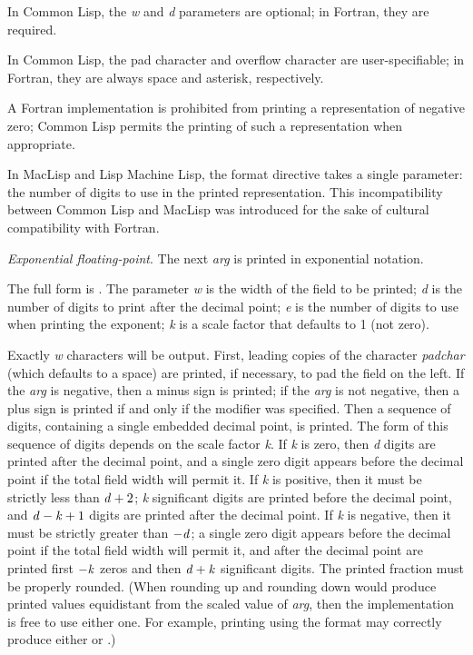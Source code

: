 \begin{flushdesc}
\begin{incompatibility}
In Common Lisp, the {\it w} and {\it d}
parameters are optional; in Fortran, they are required.

In Common Lisp, the pad character and overflow character are user-specifiable;
in Fortran, they are always space and asterisk, respectively.

A Fortran implementation
is prohibited from printing a representation of negative zero;
Common Lisp permits the printing of such a representation when appropriate.

In MacLisp and Lisp Machine Lisp, the  format directive takes
a single parameter: the number of digits to use in the printed
representation.  This incompatibility between
Common Lisp and MacLisp was introduced for the sake of cultural compatibility
with Fortran.
\end{incompatibility}
\afternoterule

\item[\cd{{\Xtilde}E}]
{\it Exponential floating-point}.
The next {\it arg} is printed in exponential notation.

The full form is .
The parameter {\it w}
is the width of the field to be printed; {\it d} is the number
of digits to print after the decimal point; {\it e} is the number
of digits to use when printing the exponent;
{\it k} is a scale factor that defaults to 1 (not zero).

Exactly {\it w} characters will
be output.  First, leading copies of the character {\it padchar}
(which defaults to a space) are printed, if necessary, to pad the
field on the left.
If the {\it arg} is negative, then a minus sign is printed;
if the {\it arg} is not negative, then a plus sign is printed
if and only if the \cd{{\Xatsign}} modifier was specified.  Then a sequence
of digits, containing a single embedded decimal point, is printed.
The form of this sequence of digits depends on the scale factor {\it k}.
If {\it k} is zero, then {\it d} digits are printed after the decimal
point, and a single zero digit appears before the decimal point if
the total field width will permit it.  If {\it k} is positive,
then it must be strictly less than ${\it d}+2$;  {\it k} significant digits
are printed before the decimal point, and ${\it d}-{\it k}+1$
digits are printed after the decimal point.  If {\it k} is negative,
then it must be strictly greater than $-{\it d}$;
a single zero digit appears before the decimal point if
the total field width will permit it, and after the decimal point
are printed first
$-{\it k}$ zeros and then ${\it d}+{\it k}$ significant digits.
The printed fraction must be properly rounded.
(When rounding up and rounding down would produce printed values
equidistant from the scaled value of {\it arg}, then the implementation
is free to use either one.  For example, printing
 using the format  may correctly produce
either  or .)


\end{flushdesc}
